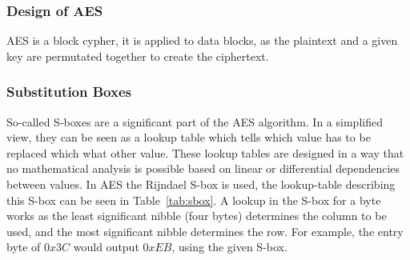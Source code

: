 \subsubsection{Design of AES}

AES is a block cypher, it is applied to data blocks, as the plaintext and a
given key are permutated together to create the ciphertext.

\subsubsection{Substitution Boxes}

So-called S-boxes are a significant part of the AES algorithm. In a simplified
view, they can be seen as a lookup table which tells which value has to be
replaced which what other value. These lookup tables are designed in a way that
no mathematical analysis is possible based on linear or differential
dependencies between values. In AES the Rijndael S-box is used, the
lookup-table describing this S-box can be seen in Table~\ref{tab:sbox}. A
lookup in the S-box for a byte works as the least significant nibble (four
bytes) determines the column to be used, and the most significant nibble
determines the row. For example, the entry byte of $0x3C$ would output $0xEB$,
using the given S-box.

